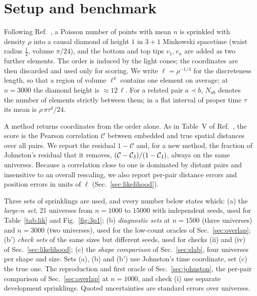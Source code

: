 \documentclass[prd,twocolumn,superscriptaddress,nofootinbib,amsmath,amssymb,floatfix]{revtex4-2}
\begin{document}
\section{Setup and benchmark}\label{sec:setup}
Following Ref.~\cite{Johnston25}, a Poisson number of points with mean $n$ is sprinkled with density $\rho$ into a causal diamond of height $1$ in $3+1$ Minkowski spacetime (waist radius $\tfrac12$, volume $\pi/24$), and the bottom and top tips $v_1,v_n$ are added as two further elements. The order is induced by the light cones; the coordinates are then discarded and used only for scoring. We write $\ell=\rho^{-1/4}$ for the discreteness length, so that a region of volume $\ell^4$ contains one element on average; at $n=3000$ the diamond height is $\approx 12\,\ell$. For a related pair $a\prec b$, $N_{ab}$ denotes the number of elements strictly between them; in a flat interval of proper time $\tau$ its mean is $\rho\,\pi\tau^4/24$.

A method returns coordinates from the order alone. As in Table~V of Ref.~\cite{Johnston25}, the score is the Pearson correlation $\mathcal C$ between embedded and true spatial distances over all pairs. We report the residual $1-\mathcal C$ and, for a new method, the fraction of Johnston's residual that it removes, $(\mathcal C-\mathcal C_{\rm J})/(1-\mathcal C_{\rm J})$, always on the same universes. Because a correlation close to one is dominated by distant pairs and insensitive to an overall rescaling, we also report per-pair distance errors and position errors in units of $\ell$ (Sec.~\ref{sec:likelihood}).

Three sets of sprinklings are used, and every number below states which: (a) the \emph{large-$n$ set}, 21 universes from $n=1000$ to $15000$ with independent seeds, used for Table~\ref{tab:lik} and Fig.~\ref{fig:3p1}; (b) \emph{diagnostic sets} at $n=1500$ (three universes) and $n=3000$ (two universes), used for the low-count oracles of Sec.~\ref{sec:overlap}; (b$'$) \emph{check sets} of the same sizes but different seeds, used for checks (ii) and (iv) of Sec.~\ref{sec:likelihood}; (c) the \emph{shape comparison} of Sec.~\ref{sec:slab}, four universes per shape and size. Sets (a), (b) and (b$'$) use Johnston's time coordinate, set (c) the true one. The reproduction and first oracle of Sec.~\ref{sec:johnston}, the per-pair comparison of Sec.~\ref{sec:overlap} at $n=1000$, and check (i) use separate development sprinklings. Quoted uncertainties are standard errors over universes.
\end{document}
